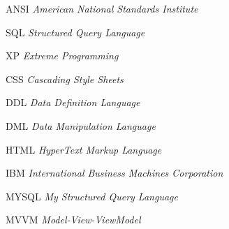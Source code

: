 \begin{siglas}
  \item[ANSI] \textit{American National Standards Institute}
  \item[SQL] \textit{Structured Query Language}
  \item[XP] \textit{Extreme Programming}
  \item[CSS] \textit{Cascading Style Sheets}
  \item[DDL] \textit{Data Definition Language}
  \item[DML] \textit{Data Manipulation Language}
  \item[HTML] \textit{HyperText Markup Language}
  \item[IBM] \textit{International Business Machines Corporation}
  \item[MYSQL] \textit{My Structured Query Language}
  \item[MVVM] \textit{Model-View-ViewModel}
\end{siglas}